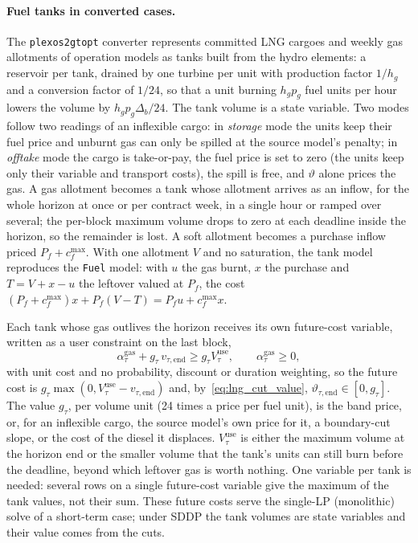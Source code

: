 \paragraph{Fuel tanks in converted cases.}
The \texttt{plexos2gtopt} converter represents committed LNG cargoes and
weekly gas allotments of operation models as tanks built from the hydro
elements: a reservoir per tank, drained by one turbine per unit with
production factor $1/h_g$ and a conversion factor of $1/24$, so that a
unit burning $h_g p_g$ fuel units per hour lowers the volume by
$h_g p_g \Delta_b/24$.  The tank volume is a state variable.  Two modes
follow two readings of an inflexible cargo: in \emph{storage} mode the
units keep their fuel price and unburnt gas can only be spilled at the
source model's penalty; in \emph{offtake} mode the cargo is take-or-pay,
the fuel price is set to zero (the units keep only their variable and
transport costs), the spill is free, and $\vartheta$ alone prices the
gas.  A gas allotment becomes a tank whose allotment arrives as an
inflow, for the whole horizon at once or per contract week, in a single
hour or ramped over several; the per-block maximum volume drops to zero
at each deadline inside the horizon, so the remainder is lost.  A soft
allotment becomes a purchase inflow priced $P_f + c^{\max}_f$.  With
one allotment $V$ and no saturation, the tank model reproduces the
\texttt{Fuel} model: with $u$ the gas burnt, $x$ the purchase and
$T = V + x - u$ the leftover valued at $P_f$, the cost
$(P_f + c^{\max}_f)x + P_f(V - T) = P_f u + c^{\max}_f x$.

Each tank whose gas outlives the horizon receives its own future-cost
variable, written as a user constraint on the last block,
\begin{equation}
\label{eq:gas_tank_fcf}
\alpha^{\mathrm{gas}}_\tau + g_\tau\, v_{\tau,\mathrm{end}}
  \geq g_\tau V^{\mathrm{use}}_\tau ,
\qquad \alpha^{\mathrm{gas}}_\tau \geq 0 ,
\end{equation}
with unit cost and no probability, discount or duration weighting, so
the future cost is $g_\tau\max(0, V^{\mathrm{use}}_\tau - v_{\tau,\mathrm{end}})$
and, by~\eqref{eq:lng_cut_value}, $\vartheta_{\tau,\mathrm{end}} \in
[0, g_\tau]$.  The value $g_\tau$, per volume unit (24 times a price
per fuel unit), is the band price, or, for an
inflexible cargo, the source model's own price for it, a boundary-cut
slope, or the cost of the diesel it displaces.  $V^{\mathrm{use}}_\tau$
is either the maximum volume at the horizon end or the smaller volume
that the tank's units can still burn before the deadline, beyond which
leftover gas is worth nothing.  One variable per tank is needed:
several rows on a single future-cost variable give the maximum of the
tank values, not their sum.  These future costs serve the single-LP
(monolithic) solve of a short-term case; under SDDP the tank volumes are
state variables and their value comes from the cuts.

